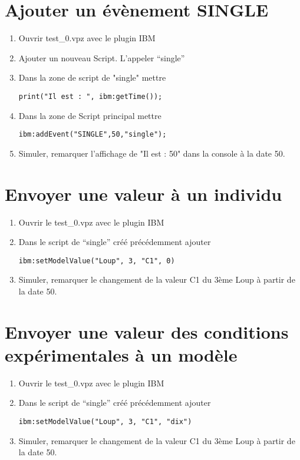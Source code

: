 \documentclass[a4paper,11pt,final]{article}
\begin{document}
\section{Ajouter un évènement SINGLE}
\begin{enumerate}
	\item Ouvrir test\_0.vpz avec le plugin IBM
	\item Ajouter un nouveau Script. L'appeler ``single''
	\item Dans la zone de script de "single" mettre 
	\begin{lstlisting}[frame=single]
print("Il est : ", ibm:getTime());
	\end{lstlisting} 
	\item Dans la zone de Script principal mettre 
	\begin{lstlisting}[frame=single]
ibm:addEvent("SINGLE",50,"single");
	\end{lstlisting}
	\item Simuler, remarquer l'affichage de "Il est : 50" dans la console à la date 50.
\end{enumerate}

\section{Envoyer une valeur à un individu}
\begin{enumerate}
\item Ouvrir le test\_0.vpz avec le plugin IBM
\item Dans le script de ``single'' créé précédemment ajouter 
\begin{lstlisting}[frame=single]
ibm:setModelValue("Loup", 3, "C1", 0)
	\end{lstlisting} 
\item Simuler, remarquer le changement de la valeur C1 du 3ème Loup à partir de la date 50.
\end{enumerate}

\section{Envoyer une valeur des conditions expérimentales à un modèle}
\begin{enumerate}
\item Ouvrir le test\_0.vpz avec le plugin IBM
\item Dans le script de ``single'' créé précédemment ajouter
\begin{lstlisting}[frame=single]
ibm:setModelValue("Loup", 3, "C1", "dix")
	\end{lstlisting} 
\item Simuler, remarquer le changement de la valeur C1 du 3ème Loup à partir de la date 50.
\end{enumerate}
\end{document}
